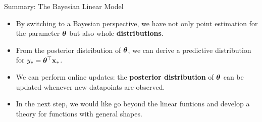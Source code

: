 
\begin{frame}[c]{Summary: The Bayesian Linear Model}

\begin{itemize}
  \item By switching to a Bayesian perspective, we have not only point estimation for the parameter $\bm{\theta}$ but also whole \textbf{distributions}.
  \lz
  \item From the posterior distribution of $\bm{\theta}$, we can derive a predictive distribution for $y_* = \bm{\theta}^\top \mathbf{x}_*$.  
  \lz
  \item We can perform online updates: the \textbf{posterior distribution} of $\bm{\theta}$ can be updated whenever new datapoints are observed. 
\lz
\item In the next step, we would like go beyond the linear funtions and develop a theory for functions with general shapes.
\end{itemize}

\end{frame}


